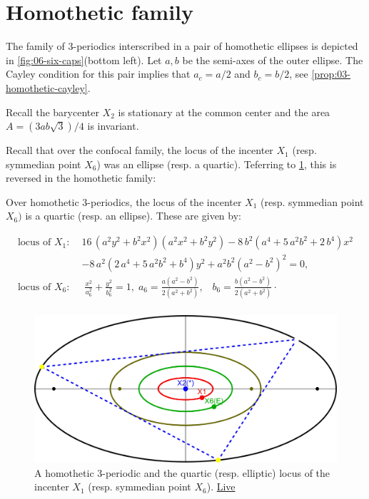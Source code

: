 \section{Homothetic family}

The family of 3-periodics interscribed in a pair of homothetic ellipses is depicted in \cref{fig:06-six-caps}(bottom left). Let $a,b$ be the semi-axes of the outer ellipse. The Cayley condition for this pair implies that $a_c=a/2$ and $b_c=b/2$, see  \cref{prop:03-homothetic-cayley}.

Recall the barycenter $X_2$ is stationary at the common center and the area $A=(3 a b \sqrt{3})/{4}$ is invariant.

Recall that over the confocal family, the locus of the incenter $X_1$ (resp. symmedian point $X_6$) was an ellipse (resp. a quartic). Teferring to \cref{fig:06-homoth-x1x6}, this is reversed in the homothetic family: 

\begin{proposition}
Over homothetic 3-periodics, the locus of the incenter $X_1$ (resp. symmedian point $X_6)$ is a quartic (resp. an ellipse). These are given by:

\begin{align*}
\text{locus of $X_1$}: \;& 
16\, \left( {a}^{2}{y}^{2}+{b}^{2}{x}^{2} \right)  \left( {a}^{2}{x}^{
2}+{b}^{2}{y}^{2} \right) -8\,{b}^{2} \left( {a}^{4}+5\,{a}^{2}{b}^{2}
+2\,{b}^{4} \right) {x}^{2}\\
&-8\,{a}^{2} \left( 2\,{a}^{4}+5\,{a}^{2}{b}
^{2}+{b}^{4} \right) {y}^{2}+{a}^{2}{b}^{2} \left( a^2-b^2 \right) ^{2}=0,
 \\
\text{locus of $X_6$}: &\; \frac{x^2}{a_6^2}+\frac{y^2}{b_6^2}=1,\;a_6=\frac{a(a^2-b^2)}{2(a^2+b^2)},\;\;\; b_6=\frac{b(a^2-b^2)}{2(a^2+b^2)} \cdot\\
\end{align*}
\label{prop:06-homoth-x1x6}
\end{proposition}

\begin{figure}
    \centering
    \includegraphics[width=.7\textwidth]{chap_06/pics/pics_06_040_homoth_x16.png}
    \caption{A homothetic 3-periodic and the quartic (resp. elliptic) locus of the incenter $X_1$ (resp. symmedian point $X_6$). \href{https://bit.ly/3oR5nCN}{Live}}
    \label{fig:06-homoth-x1x6}
\end{figure}

